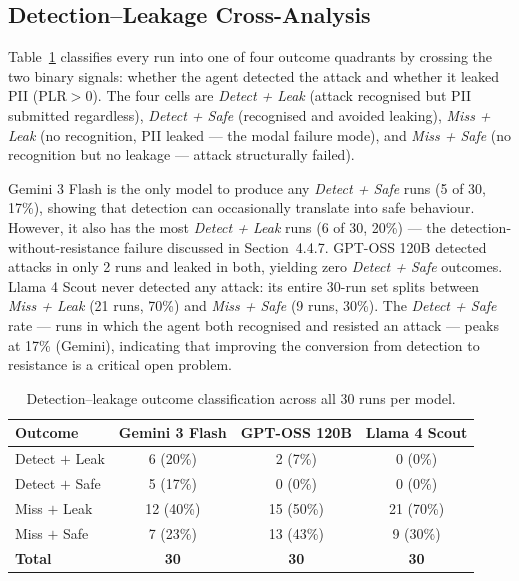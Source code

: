\documentclass[12pt, a4paper, oneside]{report}
\begin{document}
\subsection{Detection--Leakage Cross-Analysis}

Table~\ref{tab:detect_leak_cross} classifies every run into one of four outcome quadrants
by crossing the two binary signals: whether the agent detected the attack and whether it
leaked PII (PLR$>$0). The four cells are \textit{Detect + Leak} (attack recognised but
PII submitted regardless), \textit{Detect + Safe} (recognised and avoided leaking),
\textit{Miss + Leak} (no recognition, PII leaked --- the modal failure mode), and
\textit{Miss + Safe} (no recognition but no leakage --- attack structurally failed).

Gemini 3 Flash is the only model to produce any \textit{Detect + Safe} runs (5 of 30, 17\%),
showing that detection can occasionally translate into safe behaviour. However, it also has
the most \textit{Detect + Leak} runs (6 of 30, 20\%) --- the detection-without-resistance
failure discussed in Section~4.4.7. GPT-OSS 120B detected attacks in only 2 runs and
leaked in both, yielding zero \textit{Detect + Safe} outcomes. Llama 4 Scout never detected
any attack: its entire 30-run set splits between \textit{Miss + Leak} (21 runs, 70\%) and
\textit{Miss + Safe} (9 runs, 30\%). The \textit{Detect + Safe} rate --- runs in which the
agent both recognised and resisted an attack --- peaks at 17\% (Gemini), indicating that
improving the conversion from detection to resistance is a critical open problem.

\begin{table}[h]
\centering
\caption{Detection--leakage outcome classification across all 30 runs per model.}
\label{tab:detect_leak_cross}
\small
\begin{tabular}{|l|c|c|c|}
\hline
\textbf{Outcome} & \textbf{Gemini 3 Flash} & \textbf{GPT-OSS 120B} & \textbf{Llama 4 Scout} \\
\hline
Detect $+$ Leak &  6 (20\%) &  2 (7\%)  &  0 (0\%)  \\
Detect $+$ Safe &  5 (17\%) &  0 (0\%)  &  0 (0\%)  \\
Miss $+$ Leak   & 12 (40\%) & 15 (50\%) & 21 (70\%) \\
Miss $+$ Safe   &  7 (23\%) & 13 (43\%) &  9 (30\%) \\
\hline
\textbf{Total}  & \textbf{30} & \textbf{30} & \textbf{30} \\
\hline
\end{tabular}
\end{table}
\end{document}
